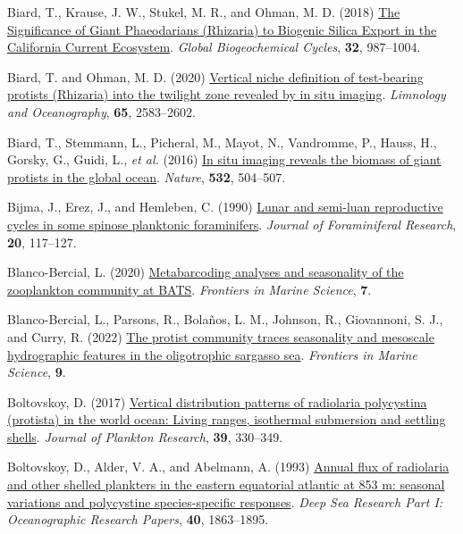 \documentclass[
]{article}
\newlength{\cslhangindent}
\newenvironment{CSLReferences}[2] %
 {\begin{list}{}{%
  \setlength{\itemindent}{0pt}
  \setlength{\leftmargin}{0pt}
  \setlength{\parsep}{0pt}
  \ifodd #1
   \setlength{\leftmargin}{\cslhangindent}
   \setlength{\itemindent}{-1\cslhangindent}
  \fi
  \setlength{\itemsep}{#2\baselineskip}}}
 {\end{list}}
\begin{document}
\begin{CSLReferences}{1}{0}
Biard, T., Krause, J. W., Stukel, M. R., and Ohman, M. D. (2018)
\href{https://doi.org/10.1029/2018GB005877}{The Significance of Giant
Phaeodarians (Rhizaria) to Biogenic Silica Export in the California
Current Ecosystem}. \emph{Global Biogeochemical Cycles}, \textbf{32},
987--1004.

Biard, T. and Ohman, M. D. (2020)
\href{https://doi.org/10.1002/lno.11472}{Vertical niche definition of
test-bearing protists (Rhizaria) into the twilight zone revealed by in
situ imaging}. \emph{Limnology and Oceanography}, \textbf{65},
2583--2602.

Biard, T., Stemmann, L., Picheral, M., Mayot, N., Vandromme, P., Hauss,
H., Gorsky, G., Guidi, L., \emph{et al.} (2016)
\href{https://doi.org/10.1038/nature17652}{In situ imaging reveals the
biomass of giant protists in the global ocean}. \emph{Nature},
\textbf{532}, 504--507.

Bijma, J., Erez, J., and Hemleben, C. (1990)
\href{https://epic.awi.de/id/eprint/6096/1/Bij1990a.pdf}{Lunar and
semi-luan reproductive cycles in some spinose planktonic foraminifers}.
\emph{Journal of Foraminiferal Research}, \textbf{20}, 117--127.

Blanco-Bercial, L. (2020)
\href{https://www.frontiersin.org/articles/10.3389/fmars.2020.00173}{Metabarcoding
analyses and seasonality of the zooplankton community at BATS}.
\emph{Frontiers in Marine Science}, \textbf{7}.

Blanco-Bercial, L., Parsons, R., Bolaños, L. M., Johnson, R.,
Giovannoni, S. J., and Curry, R. (2022)
\href{https://www.frontiersin.org/articles/10.3389/fmars.2022.897140}{The
protist community traces seasonality and mesoscale hydrographic features
in the oligotrophic sargasso sea}. \emph{Frontiers in Marine Science},
\textbf{9}.

Boltovskoy, D. (2017)
\href{https://doi.org/10.1093/plankt/fbx003}{Vertical distribution
patterns of radiolaria polycystina (protista) in the world ocean: Living
ranges, isothermal submersion and settling shells}. \emph{Journal of
Plankton Research}, \textbf{39}, 330--349.

Boltovskoy, D., Alder, V. A., and Abelmann, A. (1993)
\href{https://doi.org/10.1016/0967-0637(93)90036-3}{Annual flux of
radiolaria and other shelled plankters in the eastern equatorial
atlantic at 853 m: seasonal variations and polycystine species-specific
responses}. \emph{Deep Sea Research Part I: Oceanographic Research
Papers}, \textbf{40}, 1863--1895.


\end{CSLReferences}
\end{document}

